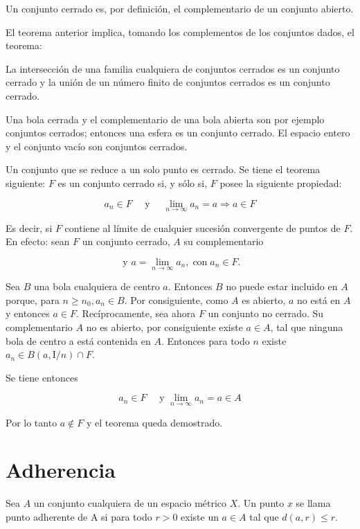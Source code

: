 \documentclass[10pt]{article}
\theoremstyle{plain}
\theoremstyle{definition}
\theoremstyle{remark}
\begin{document}
Un conjunto cerrado es, por definición, el complementario de un conjunto abierto.

El teorema anterior implica, tomando los complementos de los conjuntos dados, el teorema:

La intersección de una familia cualquiera de conjuntos cerrados es un conjunto cerrado y la unión de un número finito de conjuntos cerrados es un conjunto cerrado.

Una bola cerrada y el complementario de una bola abierta son por ejemplo conjuntos cerrados; entonces una esfera es un conjunto cerrado. El espacio entero y el conjunto vacío son conjuntos cerrados.

Un conjunto que se reduce a un solo punto es cerrado. Se tiene el teorema siguiente: $F$ es un conjunto cerrado si, y sólo si, $F$ posee la siguiente propiedad:


\begin{equation*}
a_{n} \in F \quad \text { y } \quad \lim _{n \rightarrow \infty} a_{n}=a \Rightarrow a \in F \tag{1-5}
\end{equation*}


Es decir, si $F$ contiene al límite de cualquier sucesión convergente de puntos de $F$. En efecto: sean $F$ un conjunto cerrado, $A$ su complementario


$$
\text { y } a=\lim _{n \rightarrow \infty} a_{n}, \operatorname{con} a_{n} \in F .
$$

Sea $B$ una bola cualquiera de centro $a$. Entonces $B$ no puede estar incluido en $A$ porque, para $n \geqslant n_{0}, a_{n} \in B$. Por consiguiente, como $A$ es abierto, $a$ no está en $A$ y entonces $a \in F$. Recíprocamente, sea ahora $F$ un conjunto no cerrado. Su complementario $A$ no es abierto, por consiguiente existe $a \in A$, tal que ninguna bola de centro a está contenida en $A$. Entonces para todo $n$ existe $a_{n} \in B(a, \mathrm{I} / n) \cap F$.

Se tiene entonces

$$
a_{n} \in F \quad \text { y } \lim _{n \rightarrow \infty} a_{n}=a \in A
$$

Por lo tanto $a \notin F$ y el teorema queda demostrado.

\section*{Adherencia}
Sea $A$ un conjunto cualquiera de un espacio métrico $X$. Un punto $x$ se llama punto adherente de A si para todo $r>0$ existe un $a \in A$ tal que $d(a, r) \leqslant r$.
\end{document}
